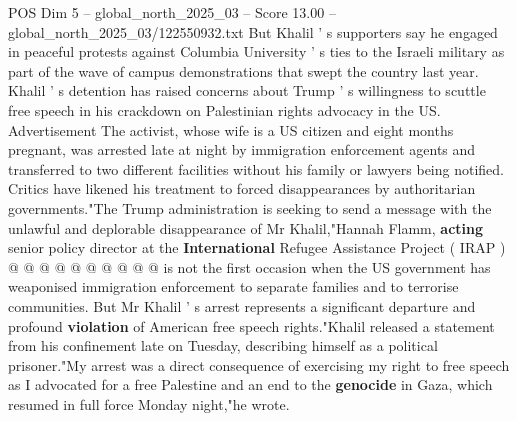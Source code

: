 \begin{textsample}{POS Dim 5 – global\_north\_2025\_03 – Score 13.00 – global\_north\_2025\_03/122550932.txt}
But Khalil ' s supporters say he engaged in peaceful protests against Columbia University ' s ties to the Israeli military as part of the wave of campus demonstrations that swept the country last year.
Khalil ' s detention has raised concerns about Trump ' s willingness to scuttle free speech in his crackdown on Palestinian rights advocacy in the US.
Advertisement The activist, whose wife is a US citizen and eight months pregnant, was arrested late at night by immigration enforcement agents and transferred to two different facilities without his family or lawyers being notified.
Critics have likened his treatment to forced disappearances by authoritarian governments."The Trump administration is seeking to send a message with the unlawful and deplorable disappearance of Mr Khalil,"Hannah Flamm, \textbf{acting} senior policy director at the \textbf{International} Refugee Assistance Project ( IRAP ) @ @ @ @ @ @ @ @ @ @ is not the first occasion when the US government has weaponised immigration enforcement to separate families and to terrorise communities.
But Mr Khalil ' s arrest represents a significant departure and profound \textbf{violation} of American free speech rights."Khalil released a statement from his confinement late on Tuesday, describing himself as a political prisoner."My arrest was a direct consequence of exercising my right to free speech as I advocated for a free Palestine and an end to the \textbf{genocide} in Gaza, which resumed in full force Monday night,"he wrote.

\end{textsample}
